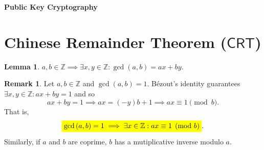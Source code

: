 \documentclass{article}
\newcommand{\mathcolorbox}[2]{\colorbox{#1}{$\displaystyle #2$}}
\newtheorem*{lemma*}{Lemma}
\theoremstyle{definition}
\newtheorem*{remark}{Remark}
\newcommand{\Z}{\mathbb{Z}}
\newcommand{\of}[1]{\left( #1 \right)}
\begin{document}
	\begin{center}
		\huge\textbf{Public Key Cryptography}\\
		\vspace{0.5em}
	\end{center}
	
	\section{Chinese Remainder Theorem ($\mathsf{CRT}$)}
	
	\begin{tcolorbox}[colback=white,colframe=lemcolor,arc=5pt,title={\color{white}\bf Bézout's Identity}]
		\begin{lemma*}
			$a,b\in\Z\implies\exists x,y\in\Z:\gcd\of{a,b}=ax+by$.
		\end{lemma*}
	\end{tcolorbox}
	\begin{remark}
		Let $a,b\in\Z$ and $\gcd\of{a,b}=1$. Bézout's identity guarantees $\exists x,y\in\Z:ax+by=1$ and so \[
		ax+by=1\implies ax=(-y)b+1\implies ax\equiv1\pmod{b}.
		\] That is, \[
		\mathcolorbox{-blue}{\gcd\of{a,b}=1\implies\exists x\in\Z:ax\equiv1\pmod{b}}.
		\] Similarly, if $a$ and $b$ are coprime, $b$ has a mutiplicative inverse modulo $a$.
	\end{remark}
	
\end{document}
